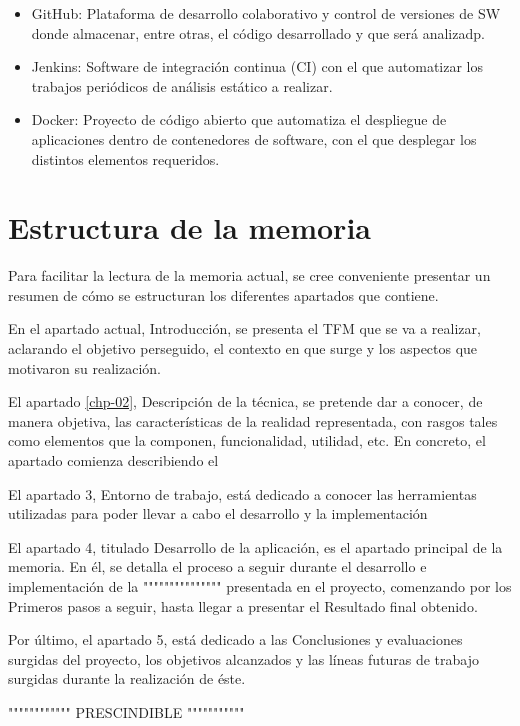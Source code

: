 \begin{itemize}
	\item GitHub\cite{github2017}: Plataforma de desarrollo colaborativo y control de versiones de \gls{SW} donde almacenar, entre otras, el código desarrollado y que será analizadp.
	\item Jenkins\cite{jenkins2017}: Software de integración continua (\gls{CI}) con el que automatizar los trabajos periódicos de análisis estático a realizar.
	\item Docker\cite{docker2017}: Proyecto de código abierto que automatiza el despliegue de aplicaciones dentro de contenedores de software, con el que desplegar los distintos elementos requeridos.
\end{itemize}


\section{Estructura de la memoria}


Para facilitar la lectura de la memoria actual, se cree conveniente presentar un resumen de cómo se estructuran los diferentes apartados que contiene.

En el apartado actual, Introducción, se presenta el \gls{TFM} que se va a realizar, aclarando el objetivo perseguido, el contexto en que surge y los aspectos que motivaron su realización.

El apartado \ref{chp-02}, Descripción de la técnica, se pretende dar a conocer, de manera objetiva, las características de la realidad representada, con rasgos tales como elementos que la componen, funcionalidad, utilidad, etc. En concreto, el apartado comienza describiendo el 

El apartado 3, Entorno de trabajo, está dedicado a conocer las herramientas utilizadas para poder llevar a cabo el desarrollo y la implementación 

El apartado 4, titulado Desarrollo de la aplicación, es el apartado principal de la memoria. En él, se detalla el proceso a seguir durante el desarrollo e implementación de la """"""""""""""" presentada en el proyecto, comenzando por los Primeros pasos a seguir, hasta llegar a presentar el Resultado final obtenido.

Por último, el apartado 5, está dedicado a las Conclusiones y evaluaciones surgidas del proyecto, los objetivos alcanzados y las líneas futuras de trabajo surgidas durante la realización de éste.

"""""""""""" PRESCINDIBLE """""""""""


